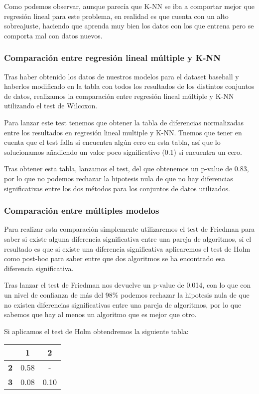 Como podemos observar, aunque parecía que K-NN se iba a comportar mejor que regresión lineal para este problema, en realidad es que cuenta con un alto sobreajuste, haciendo que aprenda muy bien los datos con los que entrena pero se comporta mal con datos nuevos.

\subsubsection{Comparación entre regresión lineal múltiple y K-NN}

Tras haber obtenido los datos de nuestros modelos para el dataset baseball y haberlos modificado en la tabla con todos los resultados de los distintos conjuntos de datos, realizamos la comparación entre regresión lineal múltiple y K-NN utilizando el test de Wilcoxon.

Para lanzar este test tenemos que obtener la tabla de diferencias normalizadas entre los resultados en regresión lineal multiple y K-NN. Tnemos que tener en cuenta que el test falla si encuentra algún cero en esta tabla, así que lo solucionamos añadiendo un valor poco significativo (0.1) si encuentra un cero.

Tras obtener esta tabla, lanzamos el test, del que obtenemos un p-value de 0.83, por lo que no podemos rechazar la hipotesis nula de que no hay diferencias significativas entre los dos métodos para los conjuntos de datos utilizados.

\subsubsection{Comparación entre múltiples modelos}

Para realizar esta comparación simplemente utilizaremos el test de Friedman para saber si existe alguna diferencia significativa entre una pareja de algoritmos, si el resultado es que si existe una diferencia significativa aplicaremos el test de Holm como post-hoc para saber entre que dos algoritmos se ha encontrado esa diferencia significativa.

Tras lanzar el test de Friedman nos devuelve un p-value de 0.014, con lo que con un nivel de confianza de más del 98\% podemos rechazar la hipotesis nula de que no existen diferencias significativas entre una pareja de algoritmos, por lo que sabemos que hay al menos un algoritmo que es mejor que otro.

Si aplicamos el test de Holm obtendremos la siguiente tabla:

\begin{table}[H]
\centering
\begin{tabular}{|c|c|c|}
\hline
\textbf{}  & \textbf{1} & \textbf{2} \\ \hline
\textbf{2} & 0.58      & -          \\ \hline
\textbf{3} & 0.08      & 0.10      \\ \hline
\end{tabular}%
\end{table}

